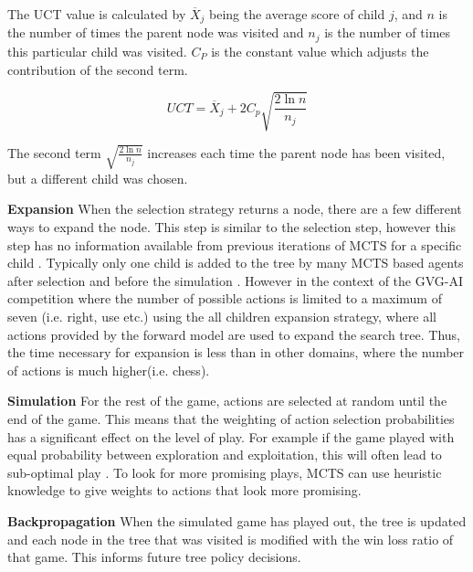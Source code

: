 \documentclass[journal]{IEEEtran}
\begin{document}
			The UCT value is calculated by \( \overline{X} _j\)   being the average score of child \( j \), and \( n \) is the number of times the parent node was visited and \(n _j \) is the number of times this particular child was visited. \( C _P \) is the constant value which adjusts the contribution of the second term. 

			\begin{equation} \label{eqUCT}
				 UCT  = \overline{X} _j + 2C _p \sqrt{\frac{ 2 \ln n}{n _j}}
			\end{equation} 

			The second term \( \sqrt{\frac{ 2 \ln n}{n _j}} \)  increases each time the parent node has been visited, but a different child was chosen.
			
		
		\textbf{Expansion}
			When the selection strategy returns a node, there are a few different ways to expand the node. This step is similar to the selection step, however this step has no information available from previous iterations of MCTS for a specific child \cite{schuster2015mcts}. 
			Typically only one child is added to the tree by many MCTS based agents after selection and before the simulation \cite{chaslot2008monte, schuster2015mcts}. However in the context of the GVG-AI competition where the number of possible actions is limited to a maximum of seven (i.e. right, use etc.) using the all children expansion strategy, where all actions provided by the forward model are used to expand the search tree. Thus, the time necessary for expansion is less than in other domains, where the number of actions is much higher(i.e. chess).
			

		\textbf{Simulation}
			For the rest of the game, actions are selected at random until the end of the game. This means that the weighting of action selection probabilities has a significant effect on the level of play. For example if the game played with equal probability between exploration and exploitation, this will often lead to sub-optimal play \cite{chaslot2008monte}. To look for more promising plays, MCTS can use heuristic knowledge to give weights to actions that look more promising.

		\textbf{Backpropagation}
			When the simulated game has played out, the tree is updated and each node in the tree that was visited is modified with the win loss ratio of that game. This informs future tree policy decisions.
			
\end{document}
